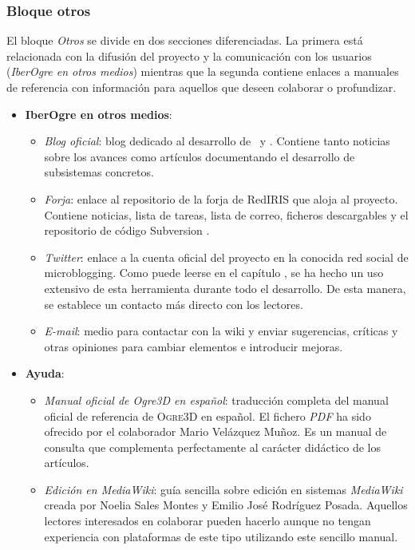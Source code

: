 
\subsubsection{Bloque otros}

El bloque \textit{Otros} se divide en dos secciones diferenciadas. La primera
está relacionada con la difusión del proyecto y la comunicación con los usuarios
(\textit{IberOgre en otros medios}) mientras que la segunda contiene enlaces
a manuales de referencia con información para aquellos que deseen colaborar
o profundizar.

\begin{itemize}
    \itemsep0em
    \item \textbf{IberOgre en otros medios}: 
        \begin{itemize}
            \itemsep0em
            \item \textit{Blog oficial}: blog dedicado al desarrollo de \wiki\
            y \juego. Contiene tanto noticias sobre los avances como artículos
            documentando el desarrollo de subsistemas concretos.
            \item \textit{Forja}: enlace al repositorio de la forja de RedIRIS
            que aloja al proyecto. Contiene noticias, lista de tareas, lista
            de correo, ficheros descargables y el repositorio de código
            Subversion \cite{website:svn}.
            \item \textit{Twitter}: enlace a la cuenta oficial del proyecto
            en la conocida red social de microblogging. Como puede leerse
            en el capítulo \nameref{chap:comunidad}, se ha hecho un uso extensivo
            de esta herramienta durante todo el desarrollo. De esta manera,
            se establece un contacto más directo con los lectores.
            \item \textit{E-mail}: medio para contactar con la wiki y enviar
            sugerencias, críticas y otras opiniones para cambiar elementos
            e introducir mejoras.
        \end{itemize}
    \item \textbf{Ayuda}: 
    \begin{itemize}
            \itemsep0em
            \item \textit{Manual oficial de Ogre3D en español}: traducción completa
            del manual oficial de referencia de \textsc{Ogre3D} en español.
            El fichero \textit{PDF} ha sido ofrecido por el colaborador
            Mario Velázquez Muñoz. Es un manual de consulta que complementa
            perfectamente al carácter didáctico de los artículos.
            \item \textit{Edición en MediaWiki}: guía sencilla sobre edición
            en sistemas \textit{MediaWiki} creada por Noelia Sales Montes
            y Emilio José Rodríguez Posada. Aquellos lectores interesados
            en colaborar pueden hacerlo aunque no tengan experiencia con plataformas
            de este tipo utilizando este sencillo manual.
        \end{itemize}
\end{itemize}

